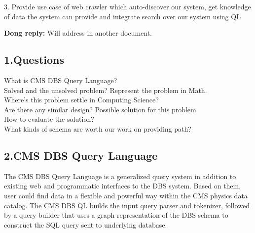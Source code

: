 3. Provide use case of web crawler which auto-discover our system, get knowledge
of data the system can provide and integrate search over our system using QL

\setlength{\parindent}{0.5in}
{\bf Dong reply:}
Will address in another document.
\setlength{\parindent}{0.25in}

\begin{center}
{\section*{{\normalsize\bf 1.Questions}}}
\end{center}
\setcounter{section}{1}
What is CMS DBS Query Language?\\
Solved and the unsolved problem? Represent the problem in Math.\\
Where's this problem settle in Computing Science? \\
Are there any similar design? Possible solution for this problem\\
How to evaluate the solution?\\
What kinds of schema are worth our work on providing path?
\begin{center}
{\section*{{\normalsize\bf 2.CMS DBS Query Language}}}
\end{center}
\setcounter{section}{2}
The CMS DBS Query Language is a generalized query system in addition to existing web and programmatic interfaces to the DBS system. Based on them, user could find data in a flexible and powerful way within the CMS physics data catalog. The CMS DBS QL builds the input query parser and tokenizer, followed by a query builder that uses a graph representation of the DBS schema to construct the SQL query sent to underlying database.

